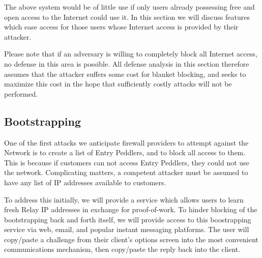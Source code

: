 
The above system would be of little use if only users already
possessing free and open access to the Internet could use it. In this
section we will discuss features which ease access for those users
whose Internet access is provided by their attacker.

Please note that if an adversary is willing to completely block all
Internet access, no defense in this area is possible. All defense
analysis in this section therefore assumes that the attacker suffers
some cost for blanket blocking, and seeks to maximize this cost in the
hope that sufficiently costly attacks will not be performed.

\subsection{Bootstrapping}

One of the first attacks we anticipate firewall providers to attempt
against the \Orchid{} Network is to create a list of Entry Peddlers, and to
block all access to them. This is because if customers can not access
Entry Peddlers, they could not use the network. Complicating matters, a
competent attacker must be assumed to have any list of IP addresses
available to customers.


To address this initially, we will provide a service which allows
users to learn fresh Relay IP addresses in exchange for proof-of-work.
To hinder blocking of the bootstrapping back and forth itself, we will
provide access to this boostrapping service via web, email, and
popular instant messaging platforms. The user will copy/paste a
challenge from their client's options screen into the most convenient
communications mechanism, then copy/paste the reply back into the
client.

